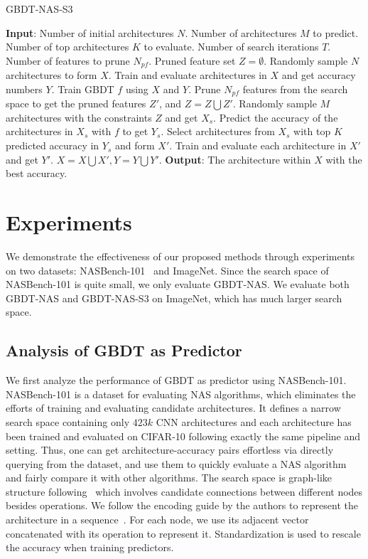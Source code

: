 \documentclass{article}
\begin{document}
\begin{algorithm}[ht]
\small
\caption{GBDT-NAS-S3}
\label{alg:GBDT-NAS-S3}
\begin{algorithmic}[1]
\STATE \textbf{Input}: Number of initial architectures $N$. Number of architectures $M$ to predict. Number of top architectures $K$ to evaluate. Number of search iterations $T$. Number of features to prune $N_{pf}$.
\STATE Pruned feature set $Z=\emptyset$.
\STATE Randomly sample $N$ architectures to form $X$.
\STATE Train and evaluate architectures in $X$ and get accuracy numbers $Y$.
\STATE Train GBDT $f$ using $X$ and $Y$.
\STATE Prune $N_{pf}$ features from the search space to get the pruned features $Z'$, and $Z=Z \bigcup Z'$.
\STATE Randomly sample $M$ architectures with the constraints $Z$ and get $X_s$.
\STATE Predict the accuracy of the architectures in $X_s$ with $f$ to get $Y_s$.
\STATE Select architectures from $X_s$ with top $K$ predicted accuracy in $Y_s$ and form $X'$.
\STATE Train and evaluate each architecture in $X'$ and get $Y'$.
\STATE $X=X\bigcup X', Y=Y\bigcup Y'$.
\ENDFOR
\STATE \textbf{Output}: The architecture within $X$ with the best accuracy.
\end{algorithmic}
\end{algorithm}


\section{Experiments}
We demonstrate the effectiveness of our proposed methods through experiments on two datasets: NASBench-101~\cite{nasbench101} and ImageNet. Since the search space of NASBench-101 is quite small, we only evaluate GBDT-NAS. We evaluate both GBDT-NAS and GBDT-NAS-S3 on ImageNet, which has much larger search space.

\subsection{Analysis of GBDT as Predictor}
We first analyze the performance of GBDT as predictor using NASBench-101. NASBench-101 is a dataset for evaluating NAS algorithms, which eliminates the efforts of training and evaluating candidate architectures. It defines a narrow search space containing only $423k$ CNN architectures and each architecture has been trained and evaluated on CIFAR-10 following exactly the same pipeline and setting. Thus, one can get architecture-accuracy pairs effortless via directly querying from the dataset, and use them to quickly evaluate a NAS algorithm and fairly compare it with other algorithms. The search space is graph-like structure following~\cite{nasnet,enas,darts} which involves candidate connections between different nodes besides operations. We follow the encoding guide by the authors to represent the architecture in a sequence~\cite{nasbench101}. For each node, we use its adjacent vector concatenated with its operation to represent it. Standardization is used to rescale the accuracy when training predictors.
\end{document}
